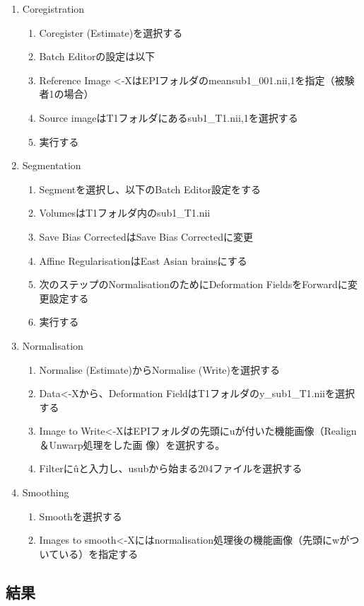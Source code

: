 \documentclass{jlreq}
\begin{document}
\begin{enumerate}
    \item Coregistration
    \begin{enumerate}
        \item Coregister (Estimate)を選択する
        \item Batch Editorの設定は以下
        \item Reference Image <-XはEPIフォルダのmeansub1\_001.nii,1を指定（被験者1の場合）
        \item Source imageはT1フォルダにあるsub1\_T1.nii,1を選択する
        \item 実行する
    \end{enumerate}
    \item Segmentation
    \begin{enumerate}
        \item Segmentを選択し、以下のBatch Editor設定をする
        \item VolumesはT1フォルダ内のsub1\_T1.nii
        \item Save Bias CorrectedはSave Bias Correctedに変更
        \item Affine RegularisationはEast Asian brainsにする
        \item 次のステップのNormalisationのためにDeformation FieldsをForwardに変更設定する
        \item 実行する
    \end{enumerate}
    \item Normalisation
    \begin{enumerate}
        \item Normalise (Estimate)からNormalise (Write)を選択する
        \item Data<-Xから、Deformation FieldはT1フォルダのy\_sub1\_T1.niiを選択する
        \item Image to Write<-XはEPIフォルダの先頭にuが付いた機能画像（Realign＆Unwarp処理をした画
        像）を選択する。
        \item Filterに\^uと入力し、usubから始まる204ファイルを選択する
        \end{enumerate}
    \item Smoothing
    \begin{enumerate}
        \item Smoothを選択する
        \item Images to smooth<-Xにはnormalisation処理後の機能画像（先頭にwがついている）を指定する  \end{enumerate}
\end{enumerate}
\subsection{結果}
\end{document}
